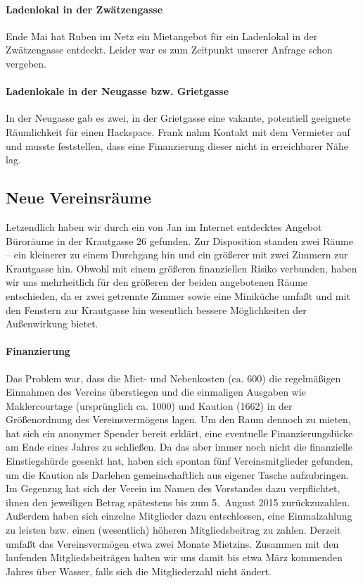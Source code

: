 \documentclass[10pt,DIV16]{scrartcl}
\begin{document}
\paragraph{Ladenlokal in der Zwätzengasse}

Ende Mai hat Ruben im Netz ein Mietangebot für ein Ladenlokal in der
Zwätzengasse entdeckt.  Leider war es zum Zeitpunkt unserer Anfrage schon
vergeben.

\paragraph{Ladenlokale in der Neugasse bzw. Grietgasse}

In der Neugasse gab es zwei, in der Grietgasse eine vakante,
potentiell geeignete Räumlichkeit für einen Hackspace. Frank nahm
Kontakt mit dem Vermieter auf und musste feststellen, dass eine
Finanzierung dieser nicht in erreichbarer Nähe lag.

\subsection{Neue Vereinsräume}

Letzendlich haben wir durch ein von Jan im Internet entdecktes
Angebot Büroräume in der Krautgasse 26 gefunden.  Zur Disposition
standen zwei Räume -- ein kleinerer zu einem Durchgang hin und ein
größerer mit zwei Zimmern zur Krautgasse hin.  Obwohl mit einem
größeren finanziellen Risiko verbunden, haben wir uns mehrheitlich
für den größeren der beiden angebotenen Räume entschieden, da er
zwei getrennte Zimmer sowie eine Miniküche umfaßt und mit den
Fenstern zur Krautgasse hin wesentlich bessere Möglichkeiten der
Außenwirkung bietet.

\paragraph{Finanzierung}
\label{sec:krautspace_kaution}

Das Problem war, dass die Miet- und Nebenkosten (ca. 600\EUR) die
regelmäßigen Einnahmen des Vereins überstiegen und die einmaligen
Ausgaben wie Maklercourtage (ursprünglich ca. 1000\EUR) und Kaution
(1662\EUR) in der Größenordnung des Vereinsvermögens lagen.  Um den
Raum dennoch zu mieten, hat sich ein anonymer Spender bereit
erklärt, eine eventuelle Finanzierungslücke am Ende eines Jahres zu
schließen.  Da das aber immer noch nicht die finanzielle
Einstiegshürde gesenkt hat, haben sich spontan fünf
Vereinsmitglieder gefunden, um die Kaution als Darlehen
gemeinschaftlich aus eigener Tasche aufzubringen.  Im Gegenzug hat
sich der Verein im Namen des Vorstandes dazu verpflichtet, ihnen den
jeweiligen Betrag spätestens bis zum 5.\ August 2015
zurückzuzahlen.  Außerdem haben sich einzelne Mitglieder dazu
entschlossen, eine Einmalzahlung zu leisten bzw. einen (wesentlich)
höheren Mitgliedsbeitrag zu zahlen.  Derzeit umfaßt das
Vereinsvermögen etwa zwei Monate Mietzins. Zusammen mit den
laufenden Mitgliedsbeiträgen halten wir uns damit bis etwa März
kommenden Jahres über Wasser, falls sich die Mitgliederzahl nicht
ändert.
\end{document}
